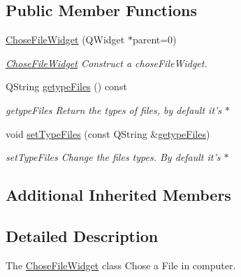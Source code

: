 \subsection*{Public Member Functions}
\begin{DoxyCompactItemize}
\item 
\hyperlink{classGui_1_1Widgets_1_1Path_1_1ChoseFileWidget_a6d1c9a76bc56c345c6702feb9d5c668e}{Chose\-File\-Widget} (Q\-Widget $\ast$parent=0)
\begin{DoxyCompactList}\small\item\em \hyperlink{classGui_1_1Widgets_1_1Path_1_1ChoseFileWidget}{Chose\-File\-Widget} Construct a chose\-File\-Widget. \end{DoxyCompactList}\item 
Q\-String \hyperlink{classGui_1_1Widgets_1_1Path_1_1ChoseFileWidget_a69fb84fdf1c4db5c544d6cc88a7e55bf}{getype\-Files} () const 
\begin{DoxyCompactList}\small\item\em getype\-Files Return the types of files, by default it's $\ast$ \end{DoxyCompactList}\item 
void \hyperlink{classGui_1_1Widgets_1_1Path_1_1ChoseFileWidget_a668dfb8a8197a0d82632d85010ae5748}{set\-Type\-Files} (const Q\-String \&\hyperlink{classGui_1_1Widgets_1_1Path_1_1ChoseFileWidget_a69fb84fdf1c4db5c544d6cc88a7e55bf}{getype\-Files})
\begin{DoxyCompactList}\small\item\em set\-Type\-Files Change the files types. By default it's $\ast$ \end{DoxyCompactList}\end{DoxyCompactItemize}
\subsection*{Additional Inherited Members}


\subsection{Detailed Description}
The \hyperlink{classGui_1_1Widgets_1_1Path_1_1ChoseFileWidget}{Chose\-File\-Widget} class Chose a File in computer. 

